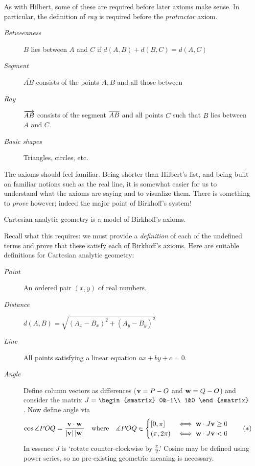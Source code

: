  As with Hilbert, some of these are required before later axioms make sense. In particular, the definition of \emph{ray} is required before the \emph{protractor} axiom.
\begin{description}
	\item[\normalfont\emph{Betweenness}] $B$ lies between $A$ and $C$ if $d(A,B)+d(B,C)=d(A,C)$
  \item[\normalfont\emph{Segment}] $\overline{AB}$ consists of the points $A,B$ and all those between
  \item[\normalfont\emph{Ray}] $\overrightarrow{AB}$ consists of the segment $\overline{AB}$ and all points $C$ such that $B$ lies between $A$ and $C$.
  \item[\normalfont\emph{Basic shapes}] Triangles, circles, etc.
\end{description}




The axioms should feel familiar. Being shorter than Hilbert's list, and being built on familiar notions such as the real line, it is somewhat easier for us to understand what the axioms are saying and to visualize them. There is something to \emph{prove} however; indeed the major point of Birkhoff's system!

\begin{thm}{}{}
	Cartesian analytic geometry is a model of Birkhoff's axioms.
\end{thm}

Recall what this requires: we must provide a \emph{definition} of each of the undefined terms and prove that these satisfy each of Birkhoff's axioms. Here are suitable definitions for Cartesian analytic geometry:
\begin{description}
	\item[\normalfont\emph{Point}] An ordered pair $(x,y)$ of real numbers.
	\item[\normalfont\emph{Distance}] $d(A,B)=\sqrt{(A_x-B_x)^2+(A_y-B_y)^2}$
	\item[\normalfont\emph{Line}] All points satisfying a linear equation $ax+by+c=0$.
	\item[\normalfont\emph{Angle}] Define column vectors as differences (${\mathbf{v}}=P-O$ and ${\mathbf{w}}=Q-O$) and consider the matrix $J=
	\begin{smatrix}
		0&-1\\
		1&0
	\end{smatrix}$. 
	Now define angle via
	\[
		\cos\measuredangle POQ=\frac{{\mathbf{v}}\cdot{\mathbf{w}}}{\left| {\mathbf{v}}\right|\left| {\mathbf{w}}\right|}
		\quad\text{where}\quad
		\measuredangle POQ\in
		\begin{cases}
			[0,\pi]&\iff{\mathbf{w}}\cdot J{\mathbf{v}}\ge 0\\
			(\pi,2\pi)&\iff{\mathbf{w}}\cdot J{\mathbf{v}}< 0
		\end{cases}
		\tag{$\ast$}
	\]
	In essence $J$ is `rotate counter-clockwise by $\frac\pi 2$.' Cosine may be defined using power series, so no pre-existing geometric meaning is necessary.
\end{description}

